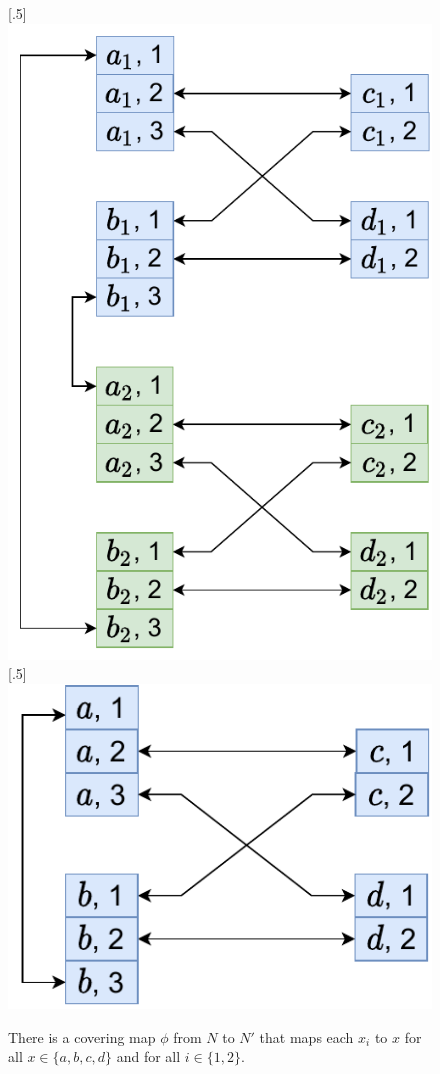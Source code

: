 \begin{figure}[H]
    [.5\linewidth] {
    \centering
    \includegraphics[scale=0.55]{diagrams/covering_map_1.pdf}
  }%
    [.5\linewidth] {
    \centering
    \includegraphics[scale=0.55]{diagrams/covering_map_2.pdf}
  }
  \caption{There is a covering map $\phi$ from $N$ to $N'$ that maps each $x_i$ to $x$ for all $x\in \{a, b, c, d\}$ and for all $i \in \{1, 2\}$.
  }
  \label{fig:covering_map1}
\end{figure}

